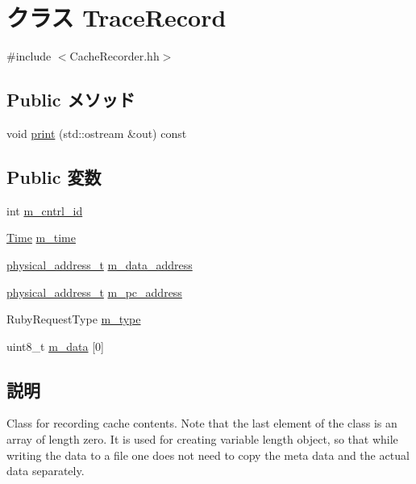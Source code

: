 \hypertarget{classTraceRecord}{
\section{クラス TraceRecord}
\label{classTraceRecord}
}


{\ttfamily \#include $<$CacheRecorder.hh$>$}\subsection*{Public メソッド}
\begin{DoxyCompactItemize}
\item 
void \hyperlink{classTraceRecord_ac55fe386a101fbae38c716067c9966a0}{print} (std::ostream \&out) const 
\end{DoxyCompactItemize}
\subsection*{Public 変数}
\begin{DoxyCompactItemize}
\item 
int \hyperlink{classTraceRecord_adfea059f9e1d33d6f5a0a4e708c46c8f}{m\_\-cntrl\_\-id}
\item 
\hyperlink{classTime}{Time} \hyperlink{classTraceRecord_abb07798437a26cd76aa37779b69dcfd3}{m\_\-time}
\item 
\hyperlink{TypeDefines_8hh_a7901e1a365850c5ff38ec6e12b6b9ffc}{physical\_\-address\_\-t} \hyperlink{classTraceRecord_ae231e39884db0f164a32dfcccdf96ca8}{m\_\-data\_\-address}
\item 
\hyperlink{TypeDefines_8hh_a7901e1a365850c5ff38ec6e12b6b9ffc}{physical\_\-address\_\-t} \hyperlink{classTraceRecord_af4c389aff33304e09db4ca9fe19764de}{m\_\-pc\_\-address}
\item 
RubyRequestType \hyperlink{classTraceRecord_a7d010f0854d320898448eae2da5997f8}{m\_\-type}
\item 
uint8\_\-t \hyperlink{classTraceRecord_af36fa4044467f20981e9d20dc30ba7ae}{m\_\-data} \mbox{[}0\mbox{]}
\end{DoxyCompactItemize}


\subsection{説明}
Class for recording cache contents. Note that the last element of the class is an array of length zero. It is used for creating variable length object, so that while writing the data to a file one does not need to copy the meta data and the actual data separately. 

